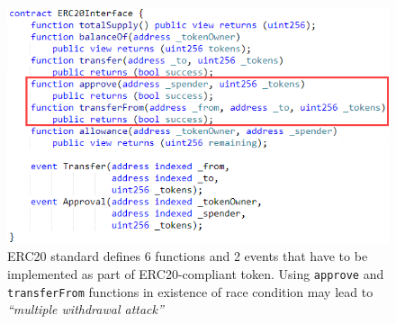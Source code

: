 \begin{figure}[t!]
	\centering
	\includegraphics[width=1.0\linewidth]{figures/multiple_withdrawal_01.png}
	\caption{ERC20 standard defines 6 functions and 2 events that have to be implemented as part of ERC20-compliant token. Using \texttt{approve} and \texttt{transferFrom} functions in existence of race condition may lead to \textit{``multiple withdrawal attack''}\label{fig:erc20api}}
\end{figure}



